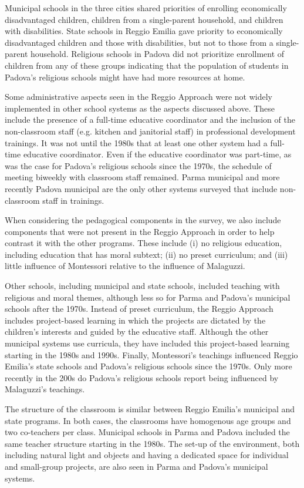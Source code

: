 \documentclass[12pt]{article}
\begin{document}
Municipal schools in the three cities shared priorities of enrolling economically disadvantaged children, children from a single-parent household, and children with disabilities. State schools in Reggio Emilia gave priority to economically disadvantaged children and those with disabilities, but not to those from a single-parent household. Religious schools in Padova did not prioritize enrollment of children from any of these groups indicating that the population of students in Padova's religious schools might have had more resources at home. %

Some administrative aspects seen in the Reggio Approach were not widely implemented in other school systems as the aspects discussed above. These include the presence of a full-time educative coordinator and the inclusion of the non-classroom staff (e.g. kitchen and janitorial staff) in professional development trainings. It was not until the 1980s that at least one other system had a full-time educative coordinator. Even if the educative coordinator was part-time, as was the case for Padova's religious schools since the 1970s, the schedule of meeting biweekly with classroom staff remained. Parma municipal and more recently Padova municipal are the only other systems surveyed that include non-classroom staff in trainings.

When considering the pedagogical components in the survey, we also include components that were not present in the Reggio Approach in order to help contrast it with the other programs. These include (i) no religious education, including education that has moral subtext; (ii) no preset curriculum; and (iii) little influence of Montessori relative to the influence of Malaguzzi. 

Other schools, including municipal and state schools, included teaching with religious and moral themes, although less so for Parma and Padova's municipal schools after the 1970s. Instead of preset curriculum, the Reggio Approach includes project-based learning in which the projects are dictated by the children's interests and guided by the educative staff. Although the other municipal systems use curricula, they have included this project-based learning starting in the 1980s and 1990s. Finally, Montessori's teachings influenced Reggio Emilia's state schools and Padova's religious schools since the 1970s. Only more recently in the 200s do Padova's religious schools report being influenced by Malaguzzi's teachings. 

The structure of the classroom is similar between Reggio Emilia's municipal and state programs. In both cases, the classrooms have homogenous age groups and two co-teachers per class. Municipal schools in Parma and Padova included the same teacher structure starting in the 1980s. The set-up of the environment, both including natural light and objects and having a dedicated space for individual and small-group projects, are also seen in Parma and Padova's municipal systems.
\end{document}
